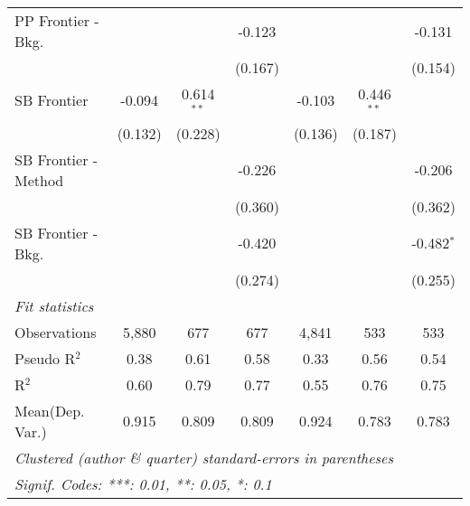 \begin{tabular}{lcccccc}
   PP Frontier - Bkg.   &              &               & -0.123      &              &               & -0.131\\   
                        &              &               & (0.167)     &              &               & (0.154)\\   
   SB Frontier          & -0.094       & 0.614$^{**}$  &             & -0.103       & 0.446$^{**}$  &   \\   
                        & (0.132)      & (0.228)       &             & (0.136)      & (0.187)       &   \\   
   SB Frontier - Method &              &               & -0.226      &              &               & -0.206\\   
                        &              &               & (0.360)     &              &               & (0.362)\\   
   SB Frontier - Bkg.   &              &               & -0.420      &              &               & -0.482$^{*}$\\   
                        &              &               & (0.274)     &              &               & (0.255)\\   
   \midrule
   \emph{Fit statistics}\\
   Observations         & 5,880        & 677           & 677         & 4,841        & 533           & 533\\  
   Pseudo R$^2$         & 0.38         & 0.61          & 0.58        & 0.33         & 0.56          & 0.54\\  
   R$^2$                & 0.60         & 0.79          & 0.77        & 0.55         & 0.76          & 0.75\\  
Mean(Dep. Var.) & 0.915 & 0.809 & 0.809 & 0.924 & 0.783 & 0.783 \\
   \midrule \midrule
   \multicolumn{7}{l}{\emph{Clustered (author \& quarter) standard-errors in parentheses}}\\
   \multicolumn{7}{l}{\emph{Signif. Codes: ***: 0.01, **: 0.05, *: 0.1}}\\
\end{tabular}
\par\endgroup
